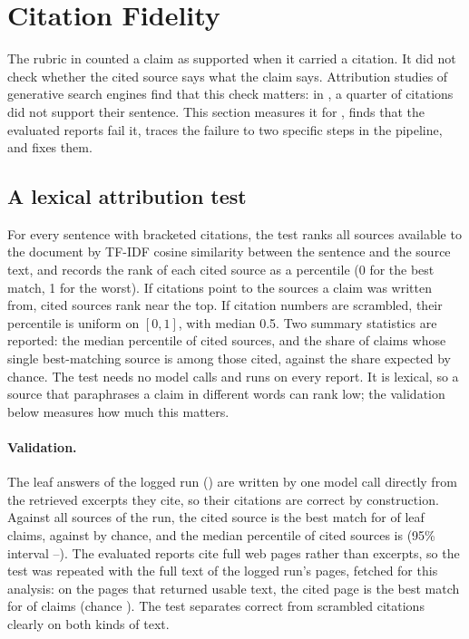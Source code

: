 \section{Citation Fidelity}
\label{sec:citations}

The rubric in  counted a claim as supported when it carried a citation. It did not check whether the cited source says what the claim says. Attribution studies of generative search engines find that this check matters: in \citet{liu2023verifiability}, a quarter of citations did not support their sentence. This section measures it for \sys{}, finds that the evaluated reports fail it, traces the failure to two specific steps in the pipeline, and fixes them.

\subsection{A lexical attribution test}
For every sentence with bracketed citations, the test ranks all sources available to the document by TF-IDF cosine similarity \citep{salton1988termweighting} between the sentence and the source text, and records the rank of each cited source as a percentile (0 for the best match, 1 for the worst). If citations point to the sources a claim was written from, cited sources rank near the top. If citation numbers are scrambled, their percentile is uniform on $[0, 1]$, with median 0.5. Two summary statistics are reported: the median percentile of cited sources, and the share of claims whose single best-matching source is among those cited, against the share expected by chance. The test needs no model calls and runs on every report. It is lexical, so a source that paraphrases a claim in different words can rank low; the validation below measures how much this matters.

\paragraph{Validation.}
The leaf answers of the logged run () are written by one model call directly from the retrieved excerpts they cite, so their citations are correct by construction. Against all \atValMeanCandidates{} sources of the run, the cited source is the best match for \atValBestCited{} of leaf claims, against \atValBestChance{} by chance, and the median percentile of cited sources is \atValMedianPct{} (95\% interval \atValPctLo--\atValPctHi). The evaluated reports cite full web pages rather than excerpts, so the test was repeated with the full text of the logged run's pages, fetched for this analysis: on the \atValPagesMeanCandidates{} pages that returned usable text, the cited page is the best match for \atValPagesBestCited{} of claims (chance \atValPagesBestChance). The test separates correct from scrambled citations clearly on both kinds of text.

